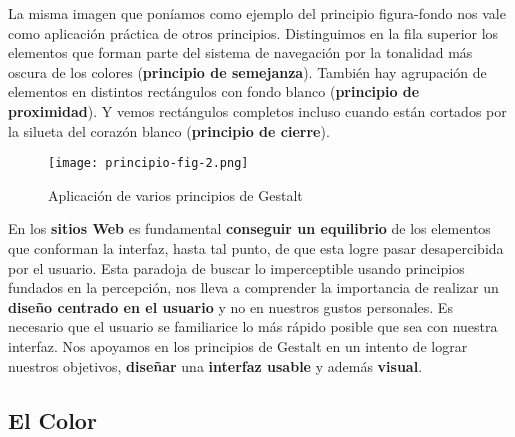La misma imagen que poníamos como ejemplo del principio figura-fondo nos vale como aplicación práctica de otros principios. Distinguimos en la fila superior los elementos que forman parte del sistema de navegación por la tonalidad más oscura de los colores (\textbf{principio de semejanza}). También hay agrupación de elementos en distintos rectángulos con fondo blanco (\textbf{principio de proximidad}). Y vemos rectángulos completos incluso cuando están cortados por la silueta del corazón blanco (\textbf{principio de cierre}).

\begin{figure}[H]
    \centering
    \texttt{[image: principio-fig-2.png]}
    \caption{Aplicación de varios principios de Gestalt}
\end{figure}

En los \textbf{sitios Web } es fundamental \textbf{conseguir un equilibrio} de los elementos que conforman la interfaz, hasta tal punto, de que esta logre pasar desapercibida por el usuario. Esta paradoja de buscar lo imperceptible usando principios fundados en la percepción, nos lleva a comprender la importancia de realizar un \textbf{diseño centrado en el usuario} y no en nuestros gustos personales. Es necesario que el usuario se familiarice lo más rápido posible que sea con nuestra interfaz. Nos apoyamos en los principios de Gestalt en un intento de lograr nuestros objetivos, \textbf{diseñar} una \textbf{interfaz usable} y además \textbf{visual}.

\subsection{El Color}





